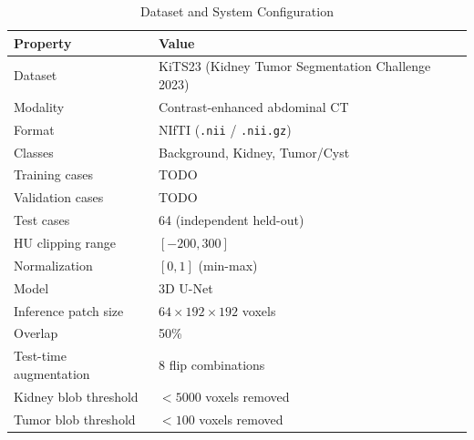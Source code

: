 
\begin{table}[!t]
\caption{Dataset and System Configuration}
\label{tab:dataset_config}
\centering
\begin{tabular}{@{}ll@{}}
\toprule
\textbf{Property} & \textbf{Value} \\
\midrule
Dataset & KiTS23 (Kidney Tumor Segmentation Challenge 2023) \\
Modality & Contrast-enhanced abdominal CT \\
Format & NIfTI (\texttt{.nii} / \texttt{.nii.gz}) \\
Classes & Background, Kidney, Tumor/Cyst \\
Training cases & TODO \\
Validation cases & TODO \\
Test cases & 64 (independent held-out) \\
HU clipping range & $[-200, 300]$ \\
Normalization & $[0, 1]$ (min-max) \\
Model & 3D U-Net \\
Inference patch size & $64 \times 192 \times 192$ voxels \\
Overlap & 50\% \\
Test-time augmentation & 8 flip combinations \\
Kidney blob threshold & $< 5000$ voxels removed \\
Tumor blob threshold & $< 100$ voxels removed \\
\bottomrule
\end{tabular}
\end{table}
